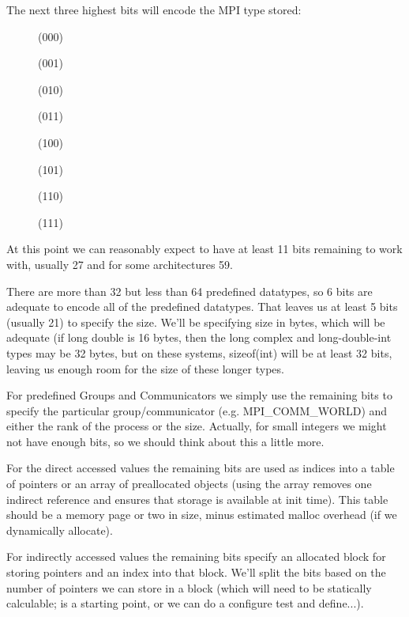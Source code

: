 \documentclass{article}
\begin{document}
The next three highest bits will encode the MPI type stored:
\begin{description}
\item[]     (000)
\item[]    (001)
\item[] (010)
\item[]     (011)
\item[](100)
\item[]       (101)
\item[]     (110)
\item[]      (111)
\end{description}

At this point we can reasonably expect to have at least 11 bits remaining
to work with, usually 27 and for some architectures 59.

There are more than 32 but less than 64 predefined datatypes, so 6 bits are
adequate to encode all of the predefined datatypes.
That leaves us at least 5 bits
(usually 21) to specify the size.  We'll be specifying size in bytes,
which will be adequate (if long double is 16 bytes, then the long complex and
long-double-int types may be 32 bytes, but on these systems, sizeof(int) will
be at least 32 bits, leaving us enough room for the size of these longer
types. 

For predefined Groups and Communicators we simply use the remaining bits
to specify the particular group/communicator (e.g. MPI_COMM_WORLD) and 
either the rank of the process or the size.  Actually, for small integers we
might not have enough bits, so we should think about this a little more.

For the direct accessed values the remaining bits are used as indices into
a table of pointers or an array of preallocated objects (using the array
removes one indirect reference and ensures that storage is available at init
time).  This table should be 
a memory page or two in size, 
minus estimated malloc overhead (if we dynamically allocate).

For indirectly accessed values the remaining bits specify an allocated block
for storing pointers and an index into that block.  We'll split the bits
based on the number of pointers we can store in a block (which will need
to be statically calculable;  is a starting point, or we
can  do a configure test and define...).
\end{document}
